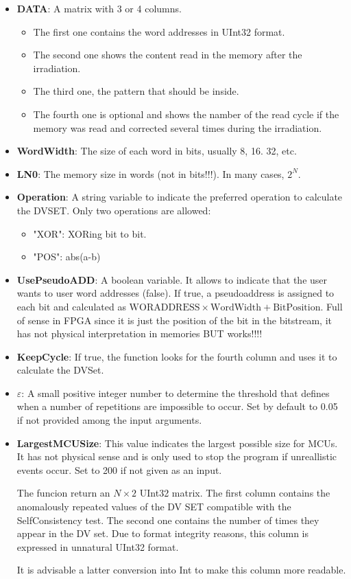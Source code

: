 \begin{itemize}
\begin{itemize}
		\item   \textbf{DATA}: A matrix with 3 or 4 columns. 
			 \begin{itemize}
			 	\item The first one contains the word addresses in UInt32 format.
			 	\item The second one shows the content read in the memory after the irradiation.
			 	\item The third one, the pattern that should be inside.
			 	\item  The fourth one is optional and shows the namber of the read cycle if the   memory was read and corrected several times during the irradiation.
			 \end{itemize}
		\item   \textbf{WordWidth}: The size of each word in bits, usually 8, 16. 32, etc.
		\item   \textbf{LN0}: The memory size in words (not in bits!!!). In many cases, \(2^N\).
		\item   \textbf{Operation}: A string variable to indicate the preferred operation to calculate
	    the DVSET. Only two operations are allowed: 
	    \begin{itemize}
	    	\item "XOR": XORing bit to bit.
	    	\item "POS": abs(a-b)
	    \end{itemize}
		\item  \textbf{UsePseudoADD}: A boolean variable. It allows to indicate that the user wants to user word addresses (false). If true, a pseudoaddress is assigned to each bit and calculated
	    as \(\text{WORADDRESS}\times\text{WordWidth} + \text{BitPosition}\). Full of sense in FPGA since it is just the position   of the bit in the bitstream, it has not physical interpretation in memories BUT works!!!!
		\item   \textbf{KeepCycle}: If true, the function looks for the fourth column and uses it to calculate the DVSet.
		\item   \textbf{\(\varepsilon\)}: A small positive integer number to determine the threshold that defines when a number of repetitions are impossible to occur. Set by default to 0.05 if not provided among the input arguments.
		\item  \textbf{LargestMCUSize}: This value indicates the largest possible size for MCUs. It has not physical sense  and is only used to stop the program if unreallistic events occur. Set to 200 if not given as an input.
	
	   The funcion return an \(N\times 2\) UInt32 matrix. The first column contains the anomalously repeated values of the DV SET compatible with the SelfConsistency test. The second one contains the number of times they appear in the DV set. Due to format integrity reasons, this column is expressed in unnatural UInt32 format. 
	  
	  It is advisable a latter conversion into Int to make this column more readable.
	\end{itemize}
\end{itemize}
%
